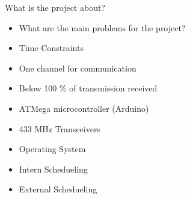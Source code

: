\begin{frame}{What is the project about?}
	\begin{blueblock}
	 	\begin{itemize}
			\item What are the main problems for the project?
			\item Time Constraints
			\item One channel for communication
			\item Below 100 \% of transmission received
		\end{itemize}
	\end{blueblock}

	\begin{blueblock}[Hardware]
		\begin{itemize}
			\item ATMega microcontroller (Arduino)
			\item 433 MHz Transceivers
			\item Operating System
			\item Intern Schedueling
			\item External Schedueling
		\end{itemize}
	\end{blueblock}

\end{frame}